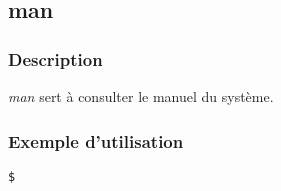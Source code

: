 \subsection{man}
\subsubsection{Description}
\emph{man} sert à consulter le manuel du système. 

\subsubsection{Exemple d'utilisation}

\begin{lstlisting}
$
\end{lstlisting}
